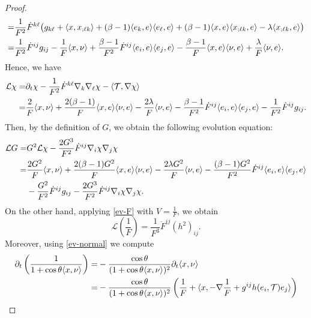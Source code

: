\documentclass[10pt,a4paper]{amsart}
\begin{document}
\begin{proof}
\begin{align}
		=&\frac{1}{F^2}\dot{F}^{k\ell}\big(g_{k\ell}+\langle x,x_{;\ell k}\rangle+(\beta-1)\langle e_k,e\rangle\langle e_{\ell},e\rangle+(\beta-1)\langle x,e\rangle\langle x_{;\ell k},e\rangle-\lambda\langle x_{;\ell k},e\rangle \big)\notag\\
	=&\frac{1}{F^2}\dot{F}^{ij}g_{ij}-\frac{1}{F}\langle x,\nu\rangle+\frac{\beta-1}{F^2}\dot{F}^{ij}\langle e_i,e\rangle\langle e_j,e\rangle-\frac{\beta-1}{F}\langle x,e\rangle\langle \nu,e\rangle+\frac{\lambda}{F}\langle \nu,e\rangle.\label{hessian-chi}
\end{align}
Hence, we have
\begin{align}
	\mathcal{L}{\chi}=&\partial_t\chi-\frac{1}{F^2}\dot{F}^{k\ell}\nabla_k\nabla_{\ell}{\chi}-\langle \mathcal{T},\nabla\chi \rangle\notag\\
	=&\frac{2}{F}\langle x,\nu\rangle+\frac{2(\beta-1)}{F}\langle x,e\rangle\langle \nu,e\rangle-\frac{2\lambda}{F}\langle \nu,e\rangle-\frac{\beta-1}{F^2}\dot{F}^{ij}\langle e_i,e\rangle\langle e_j,e\rangle-\frac{1}{F^2}\dot{F}^{ij}g_{ij}.\label{L-chi}
\end{align}
Then, by the definition of $G$, we obtain the following evolution equation:
\begin{align}
	\mathcal{L}G=&G^2\mathcal{L}{\chi}-\frac{2G^3}{F^2}\dot{F}^{ij}\nabla_i{\chi}\nabla_j{\chi}\notag\\
	=&\frac{2G^2}{F}\langle x,\nu\rangle+\frac{2(\beta-1)G^2}{F}\langle x,e\rangle\langle \nu,e\rangle-\frac{2\lambda G^2}{F}\langle \nu,e\rangle-\frac{(\beta-1)G^2}{F^2}\dot{F}^{ij}\langle e_i,e\rangle\langle e_j,e\rangle\notag\\
	&-\frac{G^2}{F^2}\dot{F}^{ij}g_{ij}-\frac{2G^3}{F^2}\dot{F}^{ij}\nabla_i{\chi}\nabla_j{\chi}.\label{L-G}
\end{align}
On the other hand, applying \eqref{ev-F} with $V=\frac{1}{F}$, we obtain
\begin{equation}\label{L-F}
	\mathcal{L}\left({\frac{1}{F}}\right)=\frac{1}{F^3}\dot{F}^{ij}(h^2)_{ij}.
\end{equation}
Moreover, using \eqref{ev-normal} we compute
\begin{align}
	\partial_t\left(\frac{1}{1+\cos\theta\langle x,\nu\rangle}\right)=&-\frac{\cos\theta}{(1+\cos\theta\langle x,\nu\rangle)^2}\partial_t{\langle x,\nu\rangle}\notag\\
	=&-\frac{\cos\theta}{(1+\cos\theta\langle x,\nu\rangle)^2}\left(\frac{1}{F}+\langle x,-\nabla \frac{1}{F}+g^{ij}h(e_i,\mathcal{T})e_j\rangle\right)\notag\\

\end{align}
\end{proof}
\end{document}
